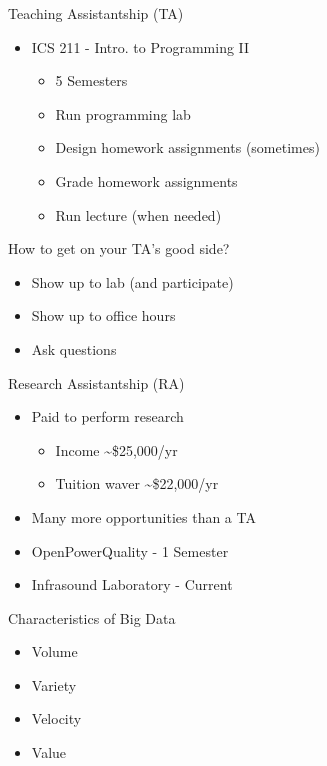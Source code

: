 \documentclass{beamer}
\begin{document}
\begin{frame}{Teaching Assistantship (TA)}
\begin{itemize}
	\item ICS 211 - Intro. to Programming II
	\begin{itemize}
		\item 5 Semesters
		\item Run programming lab
		\item Design homework assignments (sometimes)
		\item Grade homework assignments
		\item Run lecture (when needed)
	\end{itemize}
\end{itemize}
\end{frame}

\begin{frame}{How to get on your TA's good side?}
\begin{itemize}
	\item Show up to lab (and participate)
	\item Show up to office hours
	\item Ask questions
\end{itemize}
\end{frame}

\begin{frame}{Research Assistantship (RA)}
\begin{itemize}
	\item Paid to perform research 
	\begin{itemize}
		\item Income \textasciitilde\$25,000/yr
		\item Tuition waver \textasciitilde\$22,000/yr
	\end{itemize}
	\item Many more opportunities than a TA
	\item OpenPowerQuality - 1 Semester
	\item Infrasound Laboratory - Current
\end{itemize}
\end{frame}

\begin{frame}{Characteristics of Big Data}
\begin{itemize}
	\item Volume
	\item Variety
	\item Velocity
	\item Value
\end{itemize}
\end{frame}
\end{document}
